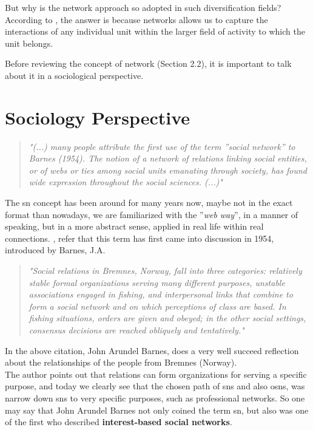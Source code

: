 \indent But why is the network approach so adopted in such diversification fields? According to \cite{kilduff2003social}, the answer is because networks allows us to capture the interactions of any individual unit within the larger field of activity to which the unit belongs.

\indent Before reviewing the concept of network (Section 2.2), it is important to talk about it in a sociological perspective.


\section{Sociology Perspective}
\begin{quote}
\textit{"(...) many people attribute the first use of the term ''social network'' to
Barnes (1954). The notion of a network of relations linking social entities, or of webs or ties among social units emanating through society, has
found wide expression throughout the social sciences. (...)"}
\cite{wasserman1994social}
\end{quote}

The \gls{sn} concept has been around for many years now, maybe not in the exact format than nowadays, we are familiarized with the ''\textit{web way}'', in a manner of speaking, but in a more abstract sense, applied in real life within real connections.
\cite{wasserman1994social}, refer that this term has first came into discussion in 1954, introduced by Barnes, J.A.

\begin{quote}
\textit{"Social relations in Bremnes, Norway, fall into three categories: relatively stable formal organizations serving many different
purposes, unstable associations engaged in fishing, and interpersonal links that combine to form a social
network and on which perceptions of class are based. In fishing situations, orders are given and
obeyed; in the other social settings, consensus decisions are reached obliquely and tentatively."}
\cite{barnes1954class}
\end{quote}

In the above citation, John Arundel Barnes, does a very well succeed reflection about the relationships of the people from Bremnes (Norway).\\
\indent The author points out that relations can form organizations for serving a specific purpose, and today we clearly see that the chosen path of
\glspl{sn} and also \glspl{osn}, was narrow down \glspl{sn} to very specific purposes, such as professional networks. So one may say that John
Arundel Barnes not only coined the term \gls{sn}, but also was one of the first who described \textbf{interest-based social networks}.\\


